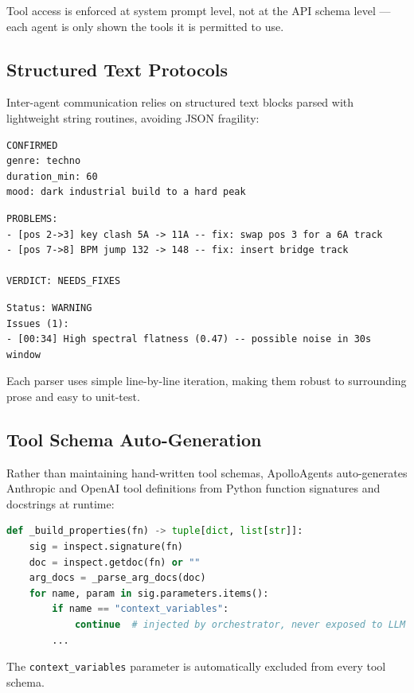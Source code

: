 \documentclass[11pt,a4paper]{article}
\begin{document}
Tool access is enforced at system prompt level, not at the API schema level
--- each agent is only shown the tools it is permitted to use.

\subsection{Structured Text Protocols}

Inter-agent communication relies on structured text blocks parsed with
lightweight string routines, avoiding JSON fragility:

\begin{lstlisting}
CONFIRMED
genre: techno
duration_min: 60
mood: dark industrial build to a hard peak
\end{lstlisting}

\begin{lstlisting}
PROBLEMS:
- [pos 2->3] key clash 5A -> 11A -- fix: swap pos 3 for a 6A track
- [pos 7->8] BPM jump 132 -> 148 -- fix: insert bridge track

VERDICT: NEEDS_FIXES
\end{lstlisting}

\begin{lstlisting}
Status: WARNING
Issues (1):
- [00:34] High spectral flatness (0.47) -- possible noise in 30s window
\end{lstlisting}

Each parser uses simple line-by-line iteration, making them robust to
surrounding prose and easy to unit-test.

\subsection{Tool Schema Auto-Generation}

Rather than maintaining hand-written tool schemas, ApolloAgents
auto-generates Anthropic and OpenAI tool definitions from Python function
signatures and docstrings at runtime:

\begin{lstlisting}[language=Python]
def _build_properties(fn) -> tuple[dict, list[str]]:
    sig = inspect.signature(fn)
    doc = inspect.getdoc(fn) or ""
    arg_docs = _parse_arg_docs(doc)
    for name, param in sig.parameters.items():
        if name == "context_variables":
            continue  # injected by orchestrator, never exposed to LLM
        ...
\end{lstlisting}

The \texttt{context\_variables} parameter is automatically excluded from
every tool schema.
\end{document}
